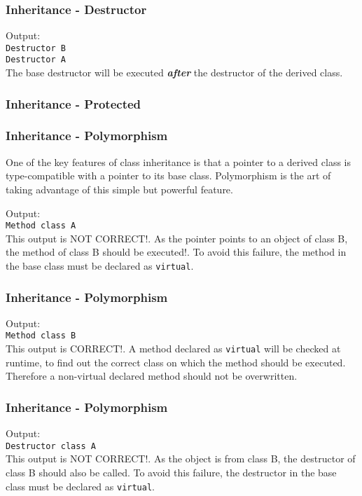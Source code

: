 \begin{frame}[fragile]
\frametitle{Inheritance - Destructor}
{\tiny

Output:\\
\verb|Destructor B|\\
\verb|Destructor A|\\
The base destructor will be executed {\bf\emph{after}} the destructor of the derived class.
}
\end{frame}

\begin{frame}[fragile]
\frametitle{Inheritance - Protected}
\end{frame}

\begin{frame}[fragile]
\frametitle{Inheritance - Polymorphism}
{\tiny
One of the key features of class inheritance is that a pointer to a derived class is type-compatible
with a pointer to its base class. Polymorphism is the art of taking advantage of this simple but
powerful feature.

Output:\\
\verb|Method class A|\\
This output is NOT CORRECT!. As the pointer points to an object of class B,
the method of class B should be executed!. To avoid this failure, the method
in the base class must be declared as \verb|virtual|.
}
\end{frame}

\begin{frame}[fragile]
\frametitle{Inheritance - Polymorphism}
{\tiny

Output:\\
\verb|Method class B|\\
This output is CORRECT!. A method declared as \verb|virtual| will be checked at runtime,
to find out the correct class on which the method should be executed.
Therefore a non-virtual declared method should not be overwritten.
}
\end{frame}

\begin{frame}[fragile]
\frametitle{Inheritance - Polymorphism}
{\tiny

Output:\\
\verb|Destructor class A|\\
This output is NOT CORRECT!. As the object is from class B, the destructor
of class B should also be called. To avoid this failure, the destructor in
the base class must be declared as \verb|virtual|. 
}
\end{frame}

